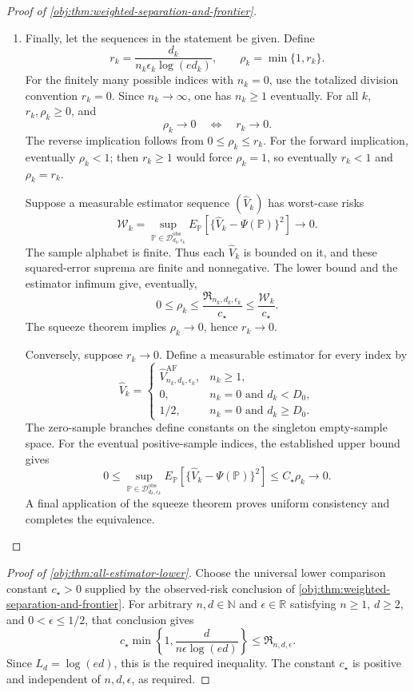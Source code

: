 \begin{proof}[Proof of \cref{obj:thm:weighted-separation-and-frontier}]
\begin{enumerate}
\item
Finally, let the sequences in the statement be given. Define
\[
r_k=\frac{d_k}{n_k\epsilon_k\log(ed_k)},
\qquad
\rho_k=\min\{1,r_k\}.
\]
For the finitely many possible indices with \(n_k=0\), use the totalized division convention \(r_k=0\). Since \(n_k\to\infty\), one has \(n_k\ge1\) eventually. For all \(k\), \(r_k,\rho_k\ge0\), and
\[
\rho_k\longrightarrow0
\quad\Longleftrightarrow\quad
r_k\longrightarrow0.
\]
The reverse implication follows from \(0\le\rho_k\le r_k\).
For the forward implication, eventually \(\rho_k<1\); then
\(r_k\ge1\) would force \(\rho_k=1\), so eventually
\(r_k<1\) and \(\rho_k=r_k\).

Suppose a measurable estimator sequence \((\widehat V_k)\) has worst-case risks
\[
\mathcal W_k
=
\sup_{\mathbb P\in\mathcal D_{d_k,\epsilon_k}^{\mathrm{obs}}}
E_{\mathbb P}
[\{\widehat V_k-\Psi(\mathbb P)\}^2]
\longrightarrow0.
\]
The sample alphabet is finite. Thus each \(\widehat V_k\) is bounded on it, and these squared-error suprema are finite and nonnegative. The lower bound and the estimator infimum give, eventually,
\[
0\le\rho_k
\le\frac{\mathfrak R_{n_k,d_k,\epsilon_k}}{c_\star}
\le\frac{\mathcal W_k}{c_\star}.
\]
The squeeze theorem implies \(\rho_k\to0\), hence \(r_k\to0\).

Conversely, suppose \(r_k\to0\). Define a measurable estimator for every index by
\[
\widehat V_k=
\begin{cases}
\widehat V_{n_k,d_k,\epsilon_k}^{\mathrm{AF}},&n_k\ge1,\\
0,&n_k=0\text{ and }d_k<D_0,\\
1/2,&n_k=0\text{ and }d_k\ge D_0.
\end{cases}
\]
The zero-sample branches define constants on the singleton empty-sample space. For the eventual positive-sample indices, the established upper bound gives
\[
0\le
\sup_{\mathbb P\in\mathcal D_{d_k,\epsilon_k}^{\mathrm{obs}}}
E_{\mathbb P}
[\{\widehat V_k-\Psi(\mathbb P)\}^2]
\le C_\star\rho_k\longrightarrow0.
\]
A final application of the squeeze theorem proves uniform consistency and completes the equivalence.
\end{enumerate}
\end{proof}

\begin{proof}[Proof of \cref{obj:thm:all-estimator-lower}]
Choose the universal lower comparison constant \(c_\star>0\) supplied by the observed-risk conclusion of \cref{obj:thm:weighted-separation-and-frontier}. For arbitrary \(n,d\in\mathbb N\) and \(\epsilon\in\mathbb R\) satisfying \(n\ge1\), \(d\ge2\), and \(0<\epsilon\le1/2\), that conclusion gives
\[
c_\star\min\left\{1,\frac{d}{n\epsilon\log(ed)}\right\}
\le \mathfrak R_{n,d,\epsilon}.
\]
Since \(L_d=\log(ed)\), this is the required inequality. The constant \(c_\star\) is positive and independent of \(n,d,\epsilon\), as required.
\end{proof}
